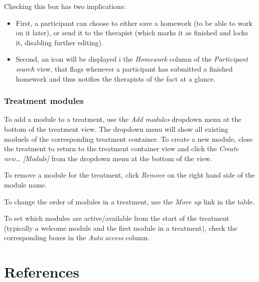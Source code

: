 \documentclass[]{book}
\providecommand{\tightlist}{%
  \setlength{\itemsep}{0pt}\setlength{\parskip}{0pt}}
\begin{document}
Checking this box has two implications:

\begin{itemize}
\tightlist
\item
  First, a participant can choose to either save a homework (to be able to work on it later), or send it to the therapist (which marks it as finished and locks it, disabling further editing).
\item
  Second, an icon will be displayed i the \emph{Homework} column of the \emph{Participant search} view, that flags whenever a participant has submitted a finished homework and thus notifies the therapists of the fact at a glance.
\end{itemize}

\hypertarget{treatment-modules}{%
\subsection{Treatment modules}\label{treatment-modules}}

To add a module to a treatment, use the \emph{Add modules} dropdown menu at the bottom of the treatment view. The dropdown menu will show all existing moduels of the corresponding treatment container. To create a new module, close the treatment to return to the treatment container view and click the \emph{Create new\ldots{} {[}Module{]}} from the dropdown menu at the bottom of the view.

To remove a module for the treatment, click \emph{Remove} on the right hand side of the module name.

To change the order of modules in a treatment, use the \emph{Move up} link in the table.

To set which modules are active/available from the start of the treatment (typically a welcome module and the first module in a treatment), check the corresponding boxes in the \emph{Auto access} column.

\hypertarget{references}{%
\chapter{References}\label{references}}


\end{document}
